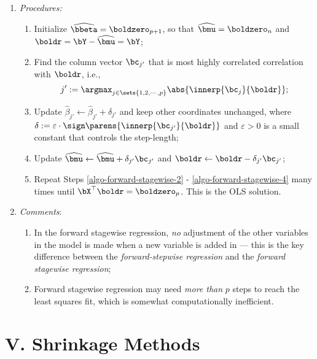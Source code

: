\documentclass[12pt]{article}
\begin{document}
\begin{enumerate}[label=\textbf{\arabic*.}]
\begin{enumerate}
		\item \textit{Procedures:}
		\begin{enumerate}[label=\roman*.]
			\item Initialize $\widehat{\bbeta} = \boldzero_{p+1}$, so that $\widehat{\bmu} = \boldzero_{n}$ and $\boldr = \bY - \widehat{\bmu} = \bY$; 
			\item \label{algo-forward-stagewise-2} Find the column vector $\bc_{j'}$ that is most highly correlated correlation with $\boldr$, i.e., 
			\begin{align*}
				j' := \argmax_{j \in \sets{1, 2, \cdots, p}} \abs{\innerp{\bc_j}{\boldr}}; 
			\end{align*}
			\item \label{algo-forward-stagewise-3} Update $\hat{\beta}_{j'} \leftarrow \hat{\beta}_{j'} + \delta_{j'}$ and keep other coordinates unchanged, where $\delta := \varepsilon \cdot \sign \parens{\innerp{\bc_{j'}}{\boldr}}$ and $\varepsilon > 0$ is a small constant that controls the step-length; 
			\item \label{algo-forward-stagewise-4} Update $\widehat{\bmu} \leftarrow \widehat{\bmu} + \delta_{j'} \bc_{j'}$ and $\boldr \leftarrow \boldr - \delta_{j'} \bc_{j'}$; 
			\item Repeat Steps \ref{algo-forward-stagewise-2} - \ref{algo-forward-stagewise-4} many times until $\bX^\top \boldr = \boldzero_{p}$. This is the OLS solution. 
		\end{enumerate}
		
		\item \textit{Comments}: 
		\begin{enumerate}
			\item In the forward stagewise regression, \emph{no} adjustment of the other variables in the model is made when a new variable is added in --- this is the key difference between the \emph{forward-stepwise regression} and the \emph{forward stagewise regression}; 
			\item Forward stagewise regression may need \emph{more than} $p$ steps to reach the least squares fit, which is somewhat computationally inefficient. 
		\end{enumerate}

	\end{enumerate}

\end{enumerate}


\section*{V. Shrinkage Methods}
\end{document}

